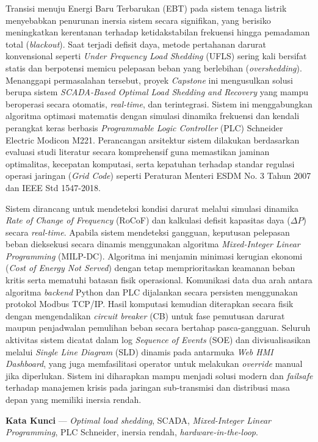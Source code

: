 
Transisi menuju Energi Baru Terbarukan (EBT) pada sistem tenaga listrik menyebabkan penurunan inersia sistem secara signifikan, yang berisiko meningkatkan kerentanan terhadap ketidakstabilan frekuensi hingga pemadaman total (\textit{blackout}). Saat terjadi defisit daya, metode pertahanan darurat konvensional seperti \textit{Under Frequency Load Shedding} (UFLS) sering kali bersifat statis dan berpotensi memicu pelepasan beban yang berlebihan (\textit{overshedding}). Menanggapi permasalahan tersebut, proyek \textit{Capstone} ini mengusulkan solusi berupa sistem \textit{SCADA-Based Optimal Load Shedding and Recovery} yang mampu beroperasi secara otomatis, \textit{real-time}, dan terintegrasi. Sistem ini menggabungkan algoritma optimasi matematis dengan simulasi dinamika frekuensi dan kendali perangkat keras berbasis \textit{Programmable Logic Controller} (PLC) Schneider Electric Modicon M221. Perancangan arsitektur sistem dilakukan berdasarkan evaluasi studi literatur secara komprehensif guna memastikan jaminan optimalitas, kecepatan komputasi, serta kepatuhan terhadap standar regulasi operasi jaringan (\textit{Grid Code}) seperti Peraturan Menteri ESDM No. 3 Tahun 2007 dan IEEE Std 1547-2018.

Sistem dirancang untuk mendeteksi kondisi darurat melalui simulasi dinamika \textit{Rate of Change of Frequency} (RoCoF) dan kalkulasi defisit kapasitas daya ($\Delta P$) secara \textit{real-time}. Apabila sistem mendeteksi gangguan, keputusan pelepasan beban dieksekusi secara dinamis menggunakan algoritma \textit{Mixed-Integer Linear Programming} (MILP-DC). Algoritma ini menjamin minimasi kerugian ekonomi (\textit{Cost of Energy Not Served}) dengan tetap memprioritaskan keamanan beban kritis serta mematuhi batasan fisik operasional. Komunikasi data dua arah antara algoritma \textit{backend} Python dan PLC dijalankan secara persisten menggunakan protokol Modbus TCP/IP. Hasil komputasi kemudian diterapkan secara fisik dengan mengendalikan \textit{circuit breaker} (CB) untuk fase pemutusan darurat maupun penjadwalan pemulihan beban secara bertahap pasca-gangguan. Seluruh aktivitas sistem dicatat dalam log \textit{Sequence of Events} (SOE) dan divisualisasikan melalui \textit{Single Line Diagram} (SLD) dinamis pada antarmuka \textit{Web HMI Dashboard}, yang juga memfasilitasi operator untuk melakukan \textit{override} manual jika diperlukan. Sistem ini diharapkan mampu menjadi solusi modern dan \textit{failsafe} terhadap manajemen krisis pada jaringan sub-transmisi dan distribusi masa depan yang memiliki inersia rendah.

\textbf{Kata Kunci} --- \textit{Optimal load shedding}, SCADA, \textit{Mixed-Integer Linear Programming}, PLC Schneider, inersia rendah, \textit{hardware-in-the-loop}.